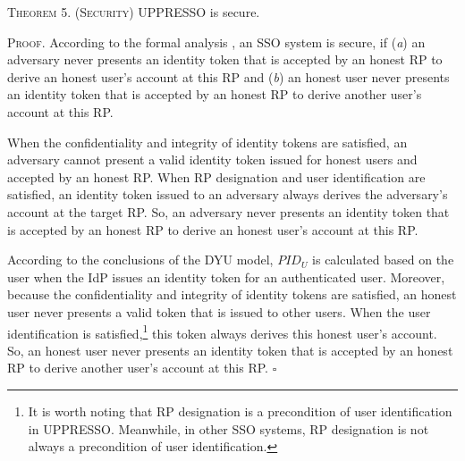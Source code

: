 {\vspace{3mm}
\noindent\textsc{Theorem 5. (Security)} {UPPRESSO is secure.}

\vspace{0.75mm}
\noindent\textsc{Proof.}
According to the formal analysis \cite{SPRESSO,FettKS14},
    an SSO system is secure, if (\emph{a}) an adversary never presents an identity token that is accepted by an honest RP to derive an honest user's account at this RP
    and (\emph{b}) an honest user never presents an identity token that is accepted by an honest RP to derive another user's account at this RP.


When the confidentiality and integrity of identity tokens are satisfied, an adversary cannot present a valid identity token issued for honest users and accepted by an honest RP.
When RP designation and user identification are satisfied, an identity token issued to an adversary always derives the adversary's account at the target RP.
So, an adversary never presents an identity token that is accepted by an honest RP to derive an honest user's account at this RP.


According to the conclusions of the DYU model, $PID_U$ is calculated based on the user when the IdP issues an identity token for an authenticated user.
Moreover, because the confidentiality and integrity of identity tokens are satisfied, an honest user never presents a valid token that is issued to other users.
When the user identification is satisfied,\footnote{It is worth noting that RP designation is a precondition of user identification in UPPRESSO. Meanwhile, in other SSO systems, RP designation is not always a precondition of user identification.} this token always derives this honest user's account.
So, an honest user never presents an identity token that is accepted by an honest RP to derive another user’s account at this RP.
\hfill $\square$

}
